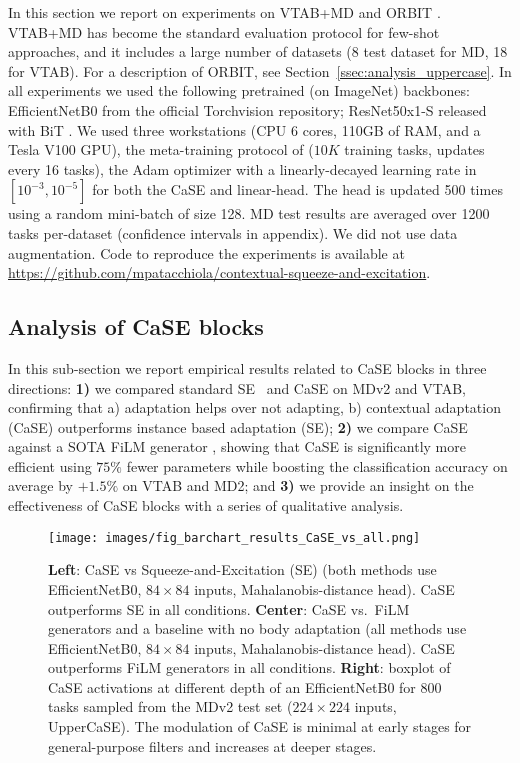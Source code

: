 \documentclass{article}
\begin{document}
In this section we report on experiments on VTAB+MD \citep{dumoulin2021comparing} and ORBIT \citep{massiceti2021orbit}. VTAB+MD has become the standard evaluation protocol for few-shot approaches, and it includes a large number of datasets (8 test dataset for MD, 18 for VTAB).
For a description of ORBIT, see Section~\ref{ssec:analysis_uppercase}. In all experiments we used the following pretrained (on ImageNet) backbones: EfficientNetB0 from the official Torchvision repository; ResNet50x1-S released with BiT \citep{kolesnikov2020big}. We used three workstations (CPU 6 cores, 110GB of RAM, and a Tesla V100 GPU), the meta-training protocol of \cite{bronskill2021memory} ($10K$ training tasks, updates every 16 tasks), the Adam optimizer with a linearly-decayed learning rate in $[10^{-3}, 10^{-5}]$ for both the CaSE and linear-head. The head is updated 500 times using a random mini-batch of size 128. MD test results are averaged over 1200 tasks per-dataset (confidence intervals in appendix). We did not use data augmentation. Code to reproduce the experiments is available at \url{https://github.com/mpatacchiola/contextual-squeeze-and-excitation}.


\subsection{Analysis of CaSE blocks} \label{ssec:analysis_case}

In this sub-section we report empirical results related to CaSE blocks in three directions: \textbf{1)} we compared standard SE~\citep{hu2018squeeze} and CaSE on MDv2 and VTAB, confirming that a) adaptation helps over not adapting, b) contextual adaptation (CaSE) outperforms instance based adaptation (SE); \textbf{2)} we compare CaSE against a SOTA FiLM generator \citep{bronskill2021memory}, showing that CaSE is significantly more efficient using $75\%$ fewer parameters while boosting the classification accuracy on average by $+1.5\%$ on VTAB and MD2; and \textbf{3)} we provide an insight on the effectiveness of CaSE blocks with a series of qualitative analysis.

\begin{figure}[t]
  \centering
  \texttt{[image: images/fig\_barchart\_results\_CaSE\_vs\_all.png]}
  \caption{\textbf{Left}: CaSE vs Squeeze-and-Excitation (SE) (both methods use EfficientNetB0, $84 \times 84$ inputs, Mahalanobis-distance head). CaSE outperforms SE in all conditions. \textbf{Center}: CaSE vs.~FiLM generators \citep{bronskill2021memory} and a baseline with no body adaptation (all methods use EfficientNetB0, $84 \times 84$ inputs, Mahalanobis-distance head). CaSE outperforms FiLM generators in all conditions. \textbf{Right}: boxplot of CaSE activations at different depth of an EfficientNetB0 for 800 tasks sampled from the MDv2 test set ($224 \times 224$ inputs, UpperCaSE). The modulation of CaSE is minimal at early stages for general-purpose filters and increases at deeper stages.}
  \label{fig:barchart_case_vs_all}
\end{figure}
\end{document}
